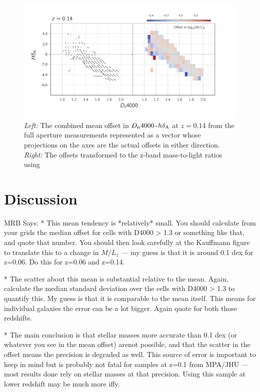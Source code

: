 \begin{figure}
\includegraphics[width=\textwidth]{figures/mlz_offset_c.pdf}
\caption[ The combined mean offset in $D_{\rm n}4000$-$h\delta_{\rm A}$ at $z=0.14$ from the full aperture measurements represented as a vector whose projections on the axes are the actual offsets in either direction ]{ \emph{Left:} The combined mean offset in $D_{\rm n}4000$-$h\delta_{\rm A}$ at $z=0.14$ from the full aperture measurements represented as a vector whose projections on the axes are the actual offsets in either direction. \emph{Right:} The offsets transformed to the z-band mass-to-light ratios using 
\label{fig:offset_quiver3}}
\end{figure}

\section{Discussion}

MRB Says: * This mean tendency is *relatively* small. You should calculate from your grids the median offset for cells with D4000 > 1.3 or something like that, and quote that number. You should then look carefully at the Kauffmann figure to translate this to a change in $M/L_z$ --- my guess is that it is around 0.1 dex for z=0.06. Do this for z=0.06 and z=0.14.

 * The scatter about this mean is substantial relative to the mean. Again, calculate the median standard deviation over the cells with D4000 > 1.3 to quantify this. My guess is that it is  comparable to the mean itself. This means for individual galaxies the error can be a lot bigger. Again quote for both those redshifts.

 * The main conclusion is that stellar masses more accurate than 0.1 dex (or whatever you see in the mean offset) arenot possible, and that the scatter in the offset means the precision is degraded as well. This source of error is important
to keep in mind but is probably not fatal for samples at z=0.1
from MPA/JHU --- most results done rely on stellar masses
at that precision. Using this sample at lower redshift may be
much more iffy.







